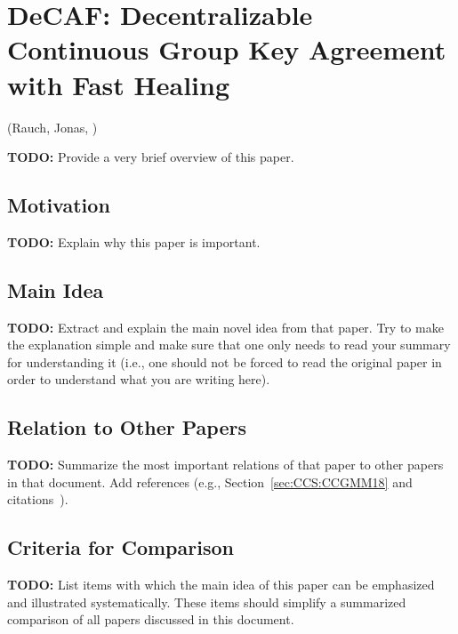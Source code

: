 \section{DeCAF: Decentralizable Continuous Group Key Agreement with Fast Healing}
\label{sec:EPRINT:AANKPP22}
(Rauch, Jonas, \cite{EPRINT:AANKPP22})

\alert{\textbf{TODO:} Provide a very brief overview of this paper.}

\subsection{Motivation}
\alert{\textbf{TODO:} Explain why this paper is important.}

\subsection{Main Idea}
\alert{\textbf{TODO:} Extract and explain the main novel idea from that paper. Try to make the explanation simple and make sure that one only needs to read your summary for understanding it (i.e., one should not be forced to read the original paper in order to understand what you are writing here).}

\subsection{Relation to Other Papers}
\alert{\textbf{TODO:} Summarize the most important relations of that paper to other papers in that document. Add references (e.g., Section~\ref{sec:CCS:CCGMM18} and citations~\cite{CCS:CCGMM18}).}

\subsection{Criteria for Comparison}
\alert{\textbf{TODO:} List items with which the main idea of this paper can be emphasized and illustrated systematically. These items should simplify a summarized comparison of all papers discussed in this document.}